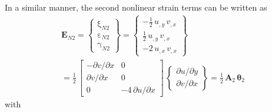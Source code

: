 In a similar manner, the second nonlinear strain terms can be written as
\begin{multline}
\mathbf{E}_{N2} =  \begin{Bmatrix}
\mathrm \xi_{N2} \\
\mathrm \varepsilon_{N2} \\
\mathrm \gamma_{N2} \end{Bmatrix} =
\begin{Bmatrix}
-\tfrac{1}{2} \, u_{,y} \, v_{,x}  \\
\tfrac{1}{2} \, u_{,y} \, v_{,x} \\
-2 \, u_{,x} \, v_{,x} \end{Bmatrix} \\ = \frac{1}{2} \, \begin{bmatrix}
- \partial v / \partial x &  0 \\
\partial v / \partial x & 0 \\
0 & -4 \, \partial u / \partial x  \end{bmatrix} \, \begin{Bmatrix}
\partial u / \partial y\\
\partial v / \partial x
\end{Bmatrix} = \tfrac{1}{2} \, \mathbf{A}_2 \, \boldsymbol{\theta}_2
\end{multline}
with  
